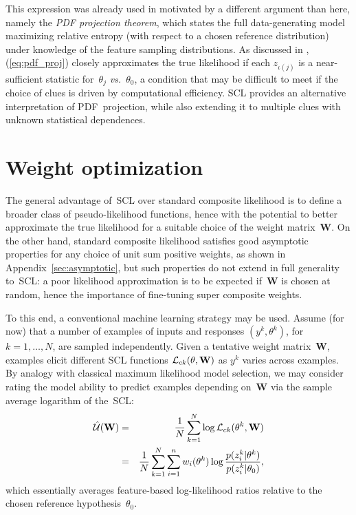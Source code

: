 \documentclass[english]{scrartcl}
\begin{document}
This expression was already used in \cite{Baggenstoss-03,Minka-04,Baggenstoss-15} motivated by a different argument than here, namely the {\em PDF projection theorem}, which states the full data-generating model maximizing relative entropy (with respect to a chosen reference distribution) under knowledge of the feature sampling distributions. As discussed in \cite{Baggenstoss-03}, (\ref{eq:pdf_proj}) closely approximates the true likelihood if each $z_{\iota(j)}$ is a near-sufficient statistic for~$\theta_j$ {\em vs.}~$\theta_0$, a condition that may be difficult to meet if the choice of clues is driven by computational efficiency. SCL provides an alternative interpretation of PDF~projection, while also extending it to multiple clues with unknown statistical dependences.


\section{Weight optimization}
\label{sec:weights}

The general advantage of~SCL over standard composite likelihood is to define a broader class of pseudo-likelihood functions, hence with the potential to better approximate the true likelihood for a suitable choice of the weight matrix~$\mathbf{W}$. On the other hand, standard composite likelihood satisfies good asymptotic properties for any choice of unit sum positive weights, as shown in Appendix~\ref{sec:asymptotic}, but such properties do not extend in full generality to~SCL: a poor likelihood approximation is to be expected if~$\mathbf{W}$ is chosen at random, hence the importance of fine-tuning super composite weights.

To this end, a conventional machine learning strategy may be used. Assume (for now) that a number of examples of inputs and responses $(y^k, \theta^k)$, for $k=1,\ldots,N$, are sampled independently. Given a tentative weight matrix~$\mathbf{W}$, examples elicit different SCL functions ${\cal L}_{ck}(\theta, \mathbf{W})$ as $y^k$ varies across examples. By analogy with classical maximum likelihood model selection, we may consider rating the model ability to predict examples depending on~$\mathbf{W}$ via the sample average logarithm of the~SCL:
\begin{eqnarray*}
\hat{\cal U}(\mathbf{W})
& = & 
\frac{1}{N} \sum_{k=1}^N \log {\cal L}_{ck}(\theta^k, \mathbf{W})\\
& = &  
\frac{1}{N} \sum_{k=1}^N \sum_{i=1}^n w_i(\theta^k) \log \frac{p(z_i^k|\theta^k)}{p(z_i^k|\theta_0)}
,
\end{eqnarray*}
which essentially averages feature-based log-likelihood ratios relative to the chosen reference hypothesis~$\theta_0$.
\end{document}
